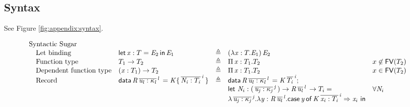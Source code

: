 \subsection{Syntax}
See Figure \ref{fig:appendix:syntax}.
\begin{figure*}[ht]
\centering
\gram{\ottpgm\ottinterrule
\ottdecl\ottinterrule
\ottu\ottinterrule
\ottp\ottinterrule
\otts\ottinterrule
\ottE\ottinterrule
\ottGs}
    \[
    \begin{array}{lllll}
    \text{Syntactic Sugar} &&&& \\
    \quad\text{Let binding} & \mathsf{let} \, \mathit{x}  :  T  =  \mathit{E_{{\mathrm{2}}}} \, \mathsf{in} \, \mathit{E_{{\mathrm{1}}}} & \triangleq & (  \lambda  \mathit{x}  :  T  .  \mathit{E_{{\mathrm{1}}}}  ) \, \mathit{E_{{\mathrm{2}}}} & \\
    \quad\text{Function type} & T_{{\mathrm{1}}}  \rightarrow  T_{{\mathrm{2}}} & \triangleq & \Pi \, \mathit{x}  :  T_{{\mathrm{1}}}  .  T_{{\mathrm{2}}} & x \not \in \mathsf{FV}(T_{{\mathrm{2}}}) \\
    \quad\text{Dependent function type} & (  \mathit{x}  :  T_{{\mathrm{1}}}  )  \rightarrow  T_{{\mathrm{2}}} & \triangleq & \Pi \, \mathit{x}  :  T_{{\mathrm{1}}}  .  T_{{\mathrm{2}}} & x \in \mathsf{FV}(T_{{\mathrm{2}}})\\
    \quad\text{Record} & \mathsf{data} \, \mathit{R} \, \overline{\mathit{u_{\mathit{l}}}  :  \kappa_{\mathit{l}}}^{\,\mathit{l}} \, =  \mathit{K}  \{ \, \overline{\mathit{N_{\mathit{i}}}  :  T_{\mathit{i}}}^{\,\mathit{i}} \, \} & \triangleq &
                    \mathsf{data} \, \mathit{R} \, \overline{\mathit{u_{\mathit{l}}}  :  \kappa_{\mathit{l}}}^{\,\mathit{l}} \, =  \mathit{K} \, \overline{T_{\mathit{i}}}^{\,\mathit{i}}; & \\
                  &&&  \mathsf{let} ~\mathit{N}_i : ( \, \overline{\mathit{u_{\mathit{j}}}  :  \kappa_{\mathit{j}}}^{\,\mathit{j}} \, )  \rightarrow  \mathit{R} \, \overline{\mathit{u_{\mathit{l}}}}^{\,\mathit{l}} \, \rightarrow  T_i = & \forall \mathit{N}_i \\
                  &&& \lambda \, \overline{\mathit{u_{\mathit{j}}}  :  \kappa_{\mathit{j}}}^{\,\mathit{j}} . \lambda  \mathit{y}  :  \mathit{R} \, \overline{\mathit{u_{\mathit{l}}}}^{\,\mathit{l}} . \mathsf{case} \, \mathit{y} \, \mathsf{of} \, \mathit{K} \, \overline{\mathit{x_{\mathit{i}}}  :  T_{\mathit{i}}}^{\,\mathit{i}}  \Rightarrow  \mathit{x}_i~ \mathsf{in}  & \\
    \end{array}
    \]
\caption{Syntax of source language}
\label{fig:appendix:syntax}
\end{figure*}

